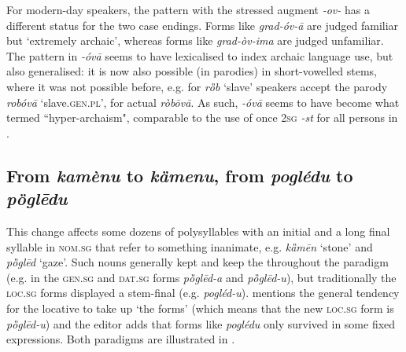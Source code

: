 \documentclass[output=paper,nonflat,colorlinks,citecolor=brown,newtxmath]{langsci/langscibook}
\begin{document}
For modern-day speakers, the pattern with the stressed augment \textit{-ov-} has a different status for the two case endings. Forms like \textit{grad-óv-ā} are judged familiar but `extremely archaic', whereas forms like \textit{grad-òv-ima} are judged unfamiliar. The pattern in \textit{-óvā} seems to have lexicalised to index archaic language use, but also generalised: it is now also possible (in parodies) in short-vowelled stems, where it was not possible before, e.g. for \textit{rȍb} `slave' speakers accept the parody \textit{robóvā} `slave.\textsc{gen}.\textsc{pl}', for actual \textit{ròbōvā}. As such, \textit{-óvā} seems to have become what \citet{Janda1994} termed ``hyper-archaism", comparable to the use of once 2\textsc{sg} \textit{-st} for all persons in .

\subsection{From \textit{kamènu} to \textit{kȁmenu}, from \textit{poglédu} to \textit{pȍglēdu}} \label{sec:kager:subsec24}
This change affects some dozens of polysyllables with an initial  and a long final syllable in \textsc{nom}.\textsc{sg} that refer to something inanimate, e.g.\textit{ kȁmēn} `stone' and \textit{pȍglēd} `gaze'. Such nouns generally kept and keep the  throughout the paradigm (e.g. in the  \textsc{gen}.\textsc{sg} and  \textsc{dat}.\textsc{sg} forms \textit{pȍglēd-a} and \textit{pȍglēd-u}), but traditionally the \textsc{loc}.\textsc{sg} forms displayed a stem-final  (e.g. \textit{pogléd-u}). \citet[30]{Klaic2013} mentions the general tendency for the locative to take up `the  forms' (which means that the new \textsc{loc}.\textsc{sg} form is \textit{pȍglēd-u}) and the editor adds that forms like \textit{poglédu} only survived in some fixed expressions. Both paradigms are illustrated in .

\begin{table}
\caption{The singular paradigms of \textit{kamen} `stone' and \textit{pogled} `gaze'}
\label{tab:kager:5}
\end{table}
\end{document}
